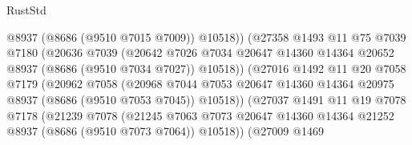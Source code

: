 \begin{lexlean}{RustStd}
\begin{coremodule}
                                  @8937
                                  (@8686 (@9510 @7015 @7009))
                                  @10518))
                              (@27358
                                @1493
                                @11
                                @75
                                @7039
                                @7180
                                (@20636
                                  @7039
                                  (@20642
                                    @7026
                                    @7034
                                    @20647
                                    @14360
                                    @14364
                                    @20652
                                    @8937
                                    (@8686 (@9510 @7034 @7027))
                                    @10518))
                                (@27016
                                  @1492
                                  @11
                                  @20
                                  @7058
                                  @7179
                                  (@20962
                                    @7058
                                    (@20968
                                      @7044
                                      @7053
                                      @20647
                                      @14360
                                      @14364
                                      @20975
                                      @8937
                                      (@8686 (@9510 @7053 @7045))
                                      @10518))
                                  (@27037
                                    @1491
                                    @11
                                    @19
                                    @7078
                                    @7178
                                    (@21239
                                      @7078
                                      (@21245
                                        @7063
                                        @7073
                                        @20647
                                        @14360
                                        @14364
                                        @21252
                                        @8937
                                        (@8686 (@9510 @7073 @7064))
                                        @10518))
                                    (@27009
                                      @1469

\end{coremodule}
\end{lexlean}
